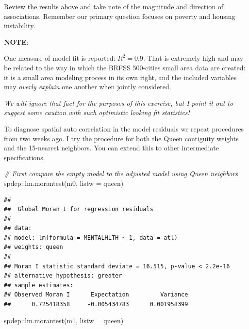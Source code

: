\documentclass[
]{book}
\newenvironment{Shaded}{\begin{snugshade}}{\end{snugshade}}
\newcommand{\AttributeTok}[1]{\textcolor[rgb]{0.77,0.63,0.00}{#1}}
\newcommand{\CommentTok}[1]{\textcolor[rgb]{0.56,0.35,0.01}{\textit{#1}}}
\newcommand{\FunctionTok}[1]{\textcolor[rgb]{0.00,0.00,0.00}{#1}}
\newcommand{\NormalTok}[1]{#1}
\newcommand{\SpecialCharTok}[1]{\textcolor[rgb]{0.00,0.00,0.00}{#1}}
\newenvironment{rmdnote}[1]
  {
  \begin{itemize}
  \renewcommand{\labelitemi}{
    \raisebox{-.7\height}[0pt][0pt]{
      {\setkeys{Gin}{width=3em,keepaspectratio}\texttt{[image: images/\#1]}}
    }
  }
  \setlength{\fboxsep}{1em}
  \begin{note}
  \item
  }
  {
  \end{note}
  \end{itemize}
  }
\begin{document}
Review the results above and take note of the magnitude and direction of associations. Remember our primary question focuses on poverty and housing instability.

\begin{rmdnote}{note}
\textbf{NOTE}:

One measure of model fit is reported: \(R^2=0.9\). That is extremely high and may be related to the way in which the BRFSS 500-cities small area data are created: it is a small area modeling process in its own right, and the included variables may \emph{overly explain} one another when jointly considered.

\emph{We will ignore that fact for the purposes of this exercise, but I point it out to suggest some caution with such optimistic looking fit statistics!}

\end{rmdnote}

To diagnose spatial auto correlation in the model residuals we repeat procedures from two weeks ago. I try the procedure for both the Queen contiguity weights and the 15-nearest neighbors. You can extend this to other intermediate specifications.

\begin{Shaded}
\begin{Highlighting}[]
\CommentTok{\# First compare the empty model to the adjusted model using Queen neighbors}
\NormalTok{spdep}\SpecialCharTok{::}\FunctionTok{lm.morantest}\NormalTok{(m0, }\AttributeTok{listw =}\NormalTok{ queen)}
\end{Highlighting}
\end{Shaded}

\begin{verbatim}
## 
##  Global Moran I for regression residuals
## 
## data:  
## model: lm(formula = MENTALHLTH ~ 1, data = atl)
## weights: queen
## 
## Moran I statistic standard deviate = 16.515, p-value < 2.2e-16
## alternative hypothesis: greater
## sample estimates:
## Observed Moran I      Expectation         Variance 
##      0.725418358     -0.005434783      0.001958399
\end{verbatim}

\begin{Shaded}
\begin{Highlighting}[]
\NormalTok{spdep}\SpecialCharTok{::}\FunctionTok{lm.morantest}\NormalTok{(m1, }\AttributeTok{listw =}\NormalTok{ queen)}
\end{Highlighting}
\end{Shaded}
\end{document}
